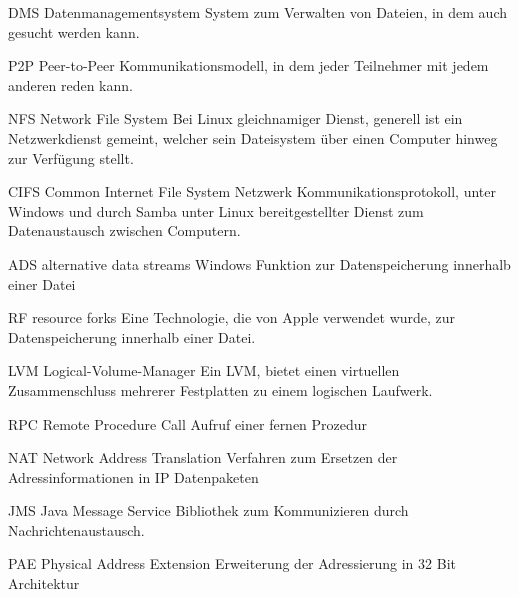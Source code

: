 
{DMS}            %
{Datenmanagementsystem}  %
{System zum Verwalten von Dateien, in dem auch gesucht werden kann.} %
 
{P2P}            %
{Peer-to-Peer}  %
{Kommunikationsmodell, in dem jeder Teilnehmer mit jedem anderen reden kann.} %
 
{NFS}            %
{Network File System}  %
{Bei Linux gleichnamiger Dienst, generell ist ein Netzwerkdienst gemeint, welcher sein Dateisystem über einen Computer hinweg zur Verfügung stellt.} %
 
{CIFS}            %
{Common Internet File System}  %
{Netzwerk Kommunikationsprotokoll, unter Windows und durch Samba unter Linux bereitgestellter Dienst zum Datenaustausch zwischen Computern.} %

{ADS}            %
{alternative data streams}  %
{Windows Funktion zur Datenspeicherung innerhalb einer Datei} %
 
{RF}            %
{resource forks}  %
{Eine Technologie, die von Apple verwendet wurde, zur Datenspeicherung innerhalb einer Datei.} %

{LVM}            %
{Logical-Volume-Manager}  %
{Ein LVM, bietet einen virtuellen Zusammenschluss mehrerer Festplatten zu einem logischen Laufwerk. } %



{RPC}            %
{Remote Procedure Call}  %
{Aufruf einer fernen Prozedur} %



{NAT}            %
{Network Address Translation}  %
{Verfahren zum Ersetzen der Adressinformationen in IP Datenpaketen} %


{JMS}            %
{Java Message Service}  %
{Bibliothek zum Kommunizieren durch Nachrichtenaustausch. } %
 
 {PAE}            %
 {Physical Address Extension}  %
 {Erweiterung der Adressierung in 32 Bit Architektur} %
 
